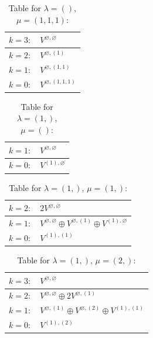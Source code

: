 \renewcommand{\arraystretch}{1.6} 
\begin{table}[H]
\centering
\caption{Table for $\lambda = ()$, $\mu = (1, 1, 1)$:}
\begin{tabular}{|>{\centering\arraybackslash}p{15cm}|}
\hline
 $k = 3: \quad V^{\varnothing, \varnothing} $ \\ \hline
 $k = 2: \quad V^{\varnothing, (1)} $ \\ \hline
 $k = 1: \quad V^{\varnothing, (1, 1)} $ \\ \hline
 $k = 0: \quad V^{\varnothing, (1, 1, 1)} $ \\ \hline
\end{tabular}
\end{table}

\renewcommand{\arraystretch}{1.6} 
\begin{table}[H]
\centering
\caption{Table for $\lambda = (1,)$, $\mu = ()$:}
\begin{tabular}{|>{\centering\arraybackslash}p{15cm}|}
\hline
 $k = 1: \quad V^{\varnothing, \varnothing} $ \\ \hline
 $k = 0: \quad V^{(1), \varnothing} $ \\ \hline
\end{tabular}
\end{table}

\renewcommand{\arraystretch}{1.6} 
\begin{table}[H]
\centering
\caption{Table for $\lambda = (1,)$, $\mu = (1,)$:}
\begin{tabular}{|>{\centering\arraybackslash}p{15cm}|}
\hline
 $k = 2: \quad 2 V^{\varnothing, \varnothing} $ \\ \hline
 $k = 1: \quad V^{\varnothing, \varnothing} \oplus V^{\varnothing, (1)} \oplus V^{(1), \varnothing} $ \\ \hline
 $k = 0: \quad V^{(1), (1)} $ \\ \hline
\end{tabular}
\end{table}

\renewcommand{\arraystretch}{1.6} 
\begin{table}[H]
\centering
\caption{Table for $\lambda = (1,)$, $\mu = (2,)$:}
\begin{tabular}{|>{\centering\arraybackslash}p{15cm}|}
\hline
 $k = 3: \quad V^{\varnothing, \varnothing} $ \\ \hline
 $k = 2: \quad V^{\varnothing, \varnothing} \oplus 2 V^{\varnothing, (1)} $ \\ \hline
 $k = 1: \quad V^{\varnothing, (1)} \oplus V^{\varnothing, (2)} \oplus V^{(1), (1)} $ \\ \hline
 $k = 0: \quad V^{(1), (2)} $ \\ \hline
\end{tabular}
\end{table}

